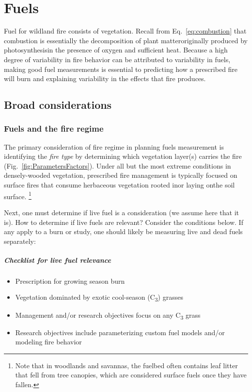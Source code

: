 \chapter{Fuels} 

Fuel for wildland fire consists of vegetation. 
Recall from Eq.~\ref{eq:combustion} that combustion is essentially the decomposition of plant matter\textemdash originally produced by photosynthesis\textemdash in the presence of oxygen and sufficient heat. 
Because a high degree of variability in fire behavior can be attributed to variability in fuels, making good fuel measurements is essential to predicting how a prescribed fire will burn and explaining variability in the effects that fire produces. 

\section{Broad considerations}

\subsection{Fuels and the fire regime}

The primary consideration of fire regime in planning fuels measurement is identifying the \emph{fire type} by determining which vegetation layer(s) carries the fire (Fig.~\ref{fig:ParametersFactors}). 
Under all but the most extreme conditions in densely-wooded vegetation, prescribed fire management is typically focused on surface fires that consume herbaceous vegetation rooted in\textemdash or laying on\textemdash the soil surface. 
\footnote{Note that in woodlands and savannas, the fuelbed often contains leaf litter that fell from tree canopies, which are considered surface fuels once they have fallen.}

Next, one must determine if live fuel is a consideration (we assume here that it is). 
How to determine if live fuels are relevant? 
Consider the conditions below. 
If any apply to a burn or study, one should likely be measuring live and dead fuels separately: 

\paragraph{Checklist for live fuel relevance} 
\begin{itemize}
	\item[{\color{BisonGreen!80}\ding{51}}] Prescription for growing season burn
	\item[{\color{BisonGreen!80}\ding{51}}] Vegetation dominated by exotic cool-season (C\textsubscript{3}) grasses
	\item[{\color{BisonGreen!80}\ding{51}}] Management and/or research objectives focus on any C\textsubscript{3} grass
	\item[{\color{BisonGreen!80}\ding{51}}] Research objectives include parameterizing custom fuel models and/or modeling fire behavior  
\end{itemize}

